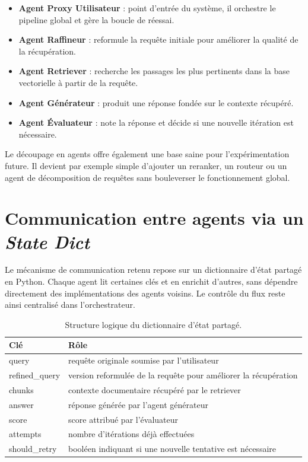 \documentclass[12pt,a4paper]{report}
\begin{document}
\begin{itemize}[leftmargin=1.2cm]
  \item \textbf{Agent Proxy Utilisateur} : point d'entrée du système, il orchestre le pipeline global et gère la boucle de réessai.
  \item \textbf{Agent Raffineur} : reformule la requête initiale pour améliorer la qualité de la récupération.
  \item \textbf{Agent Retriever} : recherche les passages les plus pertinents dans la base vectorielle à partir de la requête.
  \item \textbf{Agent Générateur} : produit une réponse fondée sur le contexte récupéré.
  \item \textbf{Agent Évaluateur} : note la réponse et décide si une nouvelle itération est nécessaire.
\end{itemize}

Le découpage en agents offre également une base saine pour l'expérimentation future. Il devient par exemple simple d'ajouter un reranker, un routeur ou un agent de décomposition de requêtes sans bouleverser le fonctionnement global.

\section{Communication entre agents via un \textit{State Dict}}

Le mécanisme de communication retenu repose sur un dictionnaire d'état partagé en Python. Chaque agent lit certaines clés et en enrichit d'autres, sans dépendre directement des implémentations des agents voisins. Le contrôle du flux reste ainsi centralisé dans l'orchestrateur.

\begin{table}[H]
  \centering
  \renewcommand{\arraystretch}{1.25}
  \begin{tabularx}{\textwidth}{>{\ttfamily}l X}
    \toprule
    Clé & Rôle \\
    \midrule
    query & requête originale soumise par l'utilisateur \\
    refined\_query & version reformulée de la requête pour améliorer la récupération \\
    chunks & contexte documentaire récupéré par le retriever \\
    answer & réponse générée par l'agent générateur \\
    score & score attribué par l'évaluateur \\
    attempts & nombre d'itérations déjà effectuées \\
    should\_retry & booléen indiquant si une nouvelle tentative est nécessaire \\
    \bottomrule
  \end{tabularx}
  \caption{Structure logique du dictionnaire d'état partagé.}
\end{table}
\end{document}
